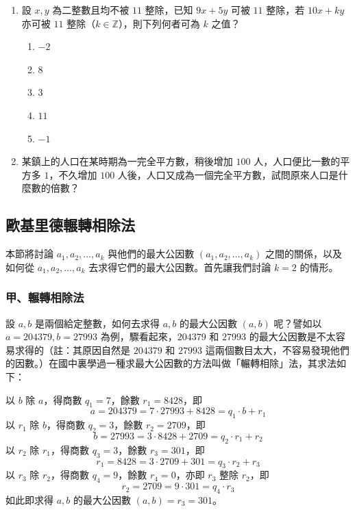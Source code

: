 \begin{enumerate}[1.]
  \item 設 $x, y$ 為二整數且均不被 $11$ 整除，已知 $9x+5y$ 可被 $11$ 整除，若 $10x+ky$ 亦可被 $11$ 整除（$k \in \mathbb{Z}$），則下列何者可為 $k$ 之值？
  \begin{enumerate}[(1)]
    \item $-2$
    \item $8$
    \item $3$
    \item $11$
    \item $-1$
  \end{enumerate}

  \item 某鎮上的人口在某時期為一完全平方數，稍後增加 $100$ 人，人口便比一數的平方多 $1$，不久增加 $100$ 人後，人口又成為一個完全平方數，試問原來人口是什麼數的倍數？
\end{enumerate}

\subsection{歐基里德輾轉相除法}\label{sec:6-2}

本節將討論 $a_1, a_2, \dots, a_k$ 與他們的最大公因數 $(a_1, a_2, \dots, a_k)$ 之間的關係，以及如何從 $a_1, a_2, \dots, a_k$ 去求得它們的最大公因數。首先讓我們討論 $k=2$ 的情形。

\subsubsection*{甲、輾轉相除法}\label{subsec:6-2-a}

設 $a, b$ 是兩個給定整數，如何去求得 $a, b$ 的最大公因數 $(a, b)$ 呢？譬如以 $a=204379, b=27993$ 為例，驟看起來，$204379$ 和 $27993$ 的最大公因數是不太容易求得的（註：其原因自然是 $204379$ 和 $27993$ 這兩個數目太大，不容易發現他們的因數。）在國中裏學過一種求最大公因數的方法叫做「輾轉相除」法，其求法如下：

以 $b$ 除 $a$，得商數 $q_1=7$，餘數 $r_1=8428$，即
\begin{equation}
  a = 204379 = 7 \cdot 27993 + 8428 = q_1 \cdot b + r_1 \label{eq:euclid_step1}
\end{equation}
以 $r_1$ 除 $b$，得商數 $q_2=3$，餘數 $r_2=2709$，即
\begin{equation}
  b = 27993 = 3 \cdot 8428 + 2709 = q_2 \cdot r_1 + r_2 \label{eq:euclid_step2}
\end{equation}
以 $r_2$ 除 $r_1$，得商數 $q_3=3$，餘數 $r_3=301$，即
\begin{equation}
  r_1 = 8428 = 3 \cdot 2709 + 301 = q_3 \cdot r_2 + r_3 \label{eq:euclid_step3}
\end{equation}
以 $r_3$ 除 $r_2$，得商數 $q_4=9$，餘數 $r_4=0$，亦即 $r_3$ 整除 $r_2$，即
\begin{equation}
  r_2 = 2709 = 9 \cdot 301 = q_4 \cdot r_3 \label{eq:euclid_step4}
\end{equation}
如此即求得 $a, b$ 的最大公因數 $(a, b) = r_3 = 301$。

